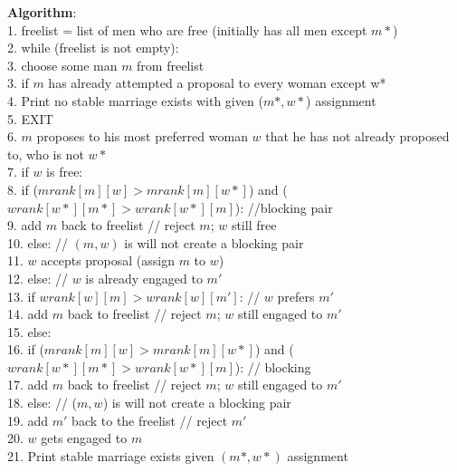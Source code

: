 \documentclass[twoside]{article}
\begin{document}
\textbf{Algorithm}:\\
1. freelist = list of men who are free (initially has all men except $m*$) \\
2. while (freelist is not empty): \\
\hspace*{7mm} 3. choose some man $m$ from freelist \\
\hspace*{7mm} 3. if $m$ has already attempted a proposal to every woman except w* \\
\hspace*{14mm} 4. Print no stable marriage exists with given ($m*, w*$) assignment \\
\hspace*{14mm} 5. EXIT \\
\hspace*{7mm} 6. $m$ proposes to his most preferred woman $w$ that he has not already proposed to, who is not $w*$ \\
\hspace*{7mm} 7. if $w$ is free: \\
\hspace*{14mm} 8. if ($mrank[m][w] > mrank[m][w*]$) and ($wrank[w*][m*] > wrank[w*][m]$): //blocking pair \\
\hspace*{21mm} 9. add $m$ back to freelist // reject $m$; $w$ still free \\ 
\hspace*{14mm} 10. else: // $(m, w)$ is will not create a blocking pair \\
\hspace*{21mm} 11. $w$ accepts proposal (assign $m$ to $w$) \\ 
\hspace*{7mm} 12. else: // $w$ is already engaged to $m'$ \\
\hspace*{14mm} 13. if $wrank[w][m] > wrank[w][m']$: // $w$ prefers $m'$ \\
\hspace*{21mm} 14. add $m$ back to freelist // reject $m$; $w$ still engaged to $m'$ \\
\hspace*{14mm} 15. else: \\
\hspace*{21mm} 16. if ($mrank[m][w] > mrank[m][w*]$) and ($wrank[w*][m*] > wrank[w*][m]$): // blocking \\
\hspace*{28mm} 17. add $m$ back to freelist // reject $m$; $w$ still engaged to $m'$ \\ 
\hspace*{21mm} 18. else: // ($m, w$) is will not create a blocking pair \\
\hspace*{28mm} 19. add $m'$ back to the freelist // reject $m'$ \\ 
\hspace*{28mm} 20. $w$ gets engaged to $m$ \\
21. Print stable marriage exists given $(m*, w*)$ assignment
\end{document}
